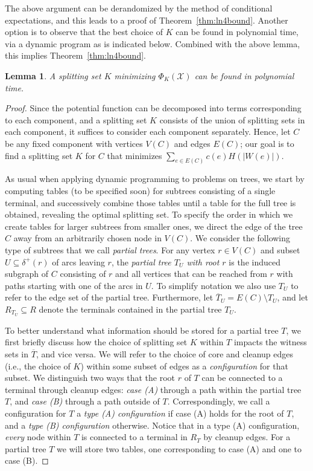 \documentclass[11pt, letterpaper]{article}
\newtheorem{lemma}[theorem]{Lemma}
\theoremstyle{definition}
\newcommand{\grphx}{\mathcal{X}}
\newcommand{\core}{K}
\newcommand{\pot}[2]{\Phi_{#1}(#2)}
\newcommand{\Pot}{\pot{\core}{\grphx}}
\begin{document}
The above argument can be derandomized by the method of conditional
expectations, and this leads to a proof of
Theorem~\ref{thm:ln4bound}. Another option is to observe that the best
choice of $\core$ can be found in polynomial time, via a dynamic
program as is indicated below.
Combined with the above lemma, this implies Theorem~\ref{thm:ln4bound}.
\begin{lemma}
	A splitting set $K$ minimizing $\Pot$ can be found in polynomial time.
\end{lemma}
\begin{proof}

Since the potential function can be decomposed into terms
corresponding to each component, and a splitting set $K$
consists of the union of splitting sets in each component,
it suffices to consider each component separately.
Hence, let $C$ be any fixed component with vertices $V(C)$
and edges $E(C)$; our goal is to
find a splitting set $K$ for $C$ that minimizes
$\sum_{e\in E(C)} c(e) H(|W(e)|)$.

As usual when applying dynamic programming to problems on trees,
we start by computing tables (to be specified soon) for subtrees 
consisting of a single terminal, and successively combine those tables
until a table for the full tree is obtained, revealing
the optimal splitting set.
To specify the order in which we create tables for larger subtrees
from smaller ones, we direct the edge of the tree $C$ away from an
arbitrarily chosen node in $V(C)$.
We consider the following type of subtrees that we call \emph{partial
trees}. For any vertex $r\in V(C)$ and subset
$U\subseteq \delta^+(r)$ of arcs leaving $r$, the
\emph{partial tree $T_U$ with root $r$} 
is the induced subgraph of $C$ consisting of $r$ and all vertices that 
can be reached from $r$ with paths starting with one of the arcs in $U$.
To simplify notation we also use $T_U$ to refer to the edge set of the partial tree.
Furthermore, let $\overline{T}_U=E(C)\setminus T_U$, and let $R_{T_U}\subseteq R$ denote the terminals contained in the partial tree $T_U$.

To better understand what information should be stored for 
a partial tree $T$, we first briefly discuss how the choice of splitting set $K$ within $T$ impacts the witness sets in $\overline{T}$, 
and vice versa.
We will refer to the choice of core and cleanup edges (i.e., the choice of $K$) within some subset of edges as a \emph{configuration} for that subset.
We distinguish two ways that the root $r$ of $T$ can be connected
to a terminal through cleanup edges: \emph{case (A)} through a path within
the partial tree $T$, and \emph{case (B)} through a path outside of $T$.
Correspondingly, we call a configuration for $T$ a \emph{type (A) configuration} if case (A) holds for the root of $T$, and a \emph{type (B) configuration} otherwise.
Notice that in a type (A) configuration, \emph{every} node within $T$ is connected to a terminal in $R_T$ by cleanup edges.
For a partial tree $T$ we will store two tables, one corresponding
to case (A) and one to case (B).


\end{proof}
\end{document}
